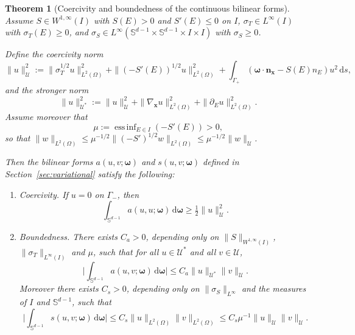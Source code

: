 \documentclass[10pt,a4paper]{amsart}
\newtheorem{theorem}{Theorem}
\renewcommand{\d}{\ensuremath{\,\mathrm{d}}}
\newcommand{\essinf}{\operatorname{ess\,inf}}         %
\newcommand{\qp}[1]{\ensuremath{\!\left({#1}\right)}}
\renewcommand{\vec}[1]{\ensuremath{\boldsymbol{#1}}}
\begin{document}
\begin{theorem}[Coercivity and boundedness of the continuous bilinear forms]
\label{the:coercivity}
Assume $S\in W^{1,\infty}(I)$ with $S(E)>0$ and $S'(E)\le 0$ on $I$,
$\sigma_T\in L^\infty(I)$ with $\sigma_T(E)\ge 0$, and $\sigma_S\in
L^\infty(\mathbb{S}^{d-1}\times\mathbb{S}^{d-1}\times I\times I)$ with
$\sigma_S\ge 0$.

Define the coercivity norm
\begin{equation*}
  \|u\|_{\mathcal{U}}^2
  :=
  \|\sigma_T^{1/2}u\|_{L^2(\Omega)}^2
  + \|(-S'(E))^{1/2}u\|_{L^2(\Omega)}^2
  + \int_{\Gamma_+} \qp{\vec{\omega}\cdot\vec{n}_{\vec x} - S(E) n_E} u^2 \d s,
\end{equation*}
and the stronger norm
\begin{equation*}
  \|u\|_{\mathcal{U}^*}^2
  :=
  \|u\|_{\mathcal{U}}^2
  + \|\nabla_{\vec x} u\|_{L^2(\Omega)}^2
  + \|\partial_E u\|_{L^2(\Omega)}^2.
\end{equation*}
Assume moreover that
\begin{equation*}
  \mu := \essinf_{E\in I}\qp{-S'(E)} > 0,
\end{equation*}
so that $\|w\|_{L^2(\Omega)} \le
\mu^{-1/2}\|(-S')^{1/2}w\|_{L^2(\Omega)} \le
\mu^{-1/2}\|w\|_{\mathcal{U}}$.

Then the bilinear forms $a(u,v;\vec{\omega})$ and $s(u,v;\vec{\omega})$
defined in Section~\ref{sec:variational} satisfy the following:

\begin{enumerate}
\item
  Coercivity. If $u=0$ on $\Gamma_-$, then
  \begin{equation*}
    \int_{\mathbb{S}^{d-1}} a(u,u;\vec{\omega}) \d\vec{\omega}
    \ge
    \tfrac{1}{2}\|u\|_{\mathcal{U}}^2.
  \end{equation*}
  
\item Boundedness. There exists $C_a>0$, depending only on
  $\|S\|_{W^{1,\infty}(I)}$, $\|\sigma_T\|_{L^\infty(I)}$ and $\mu$, such
  that for all $u\in\mathcal{U}^*$ and all $v\in\mathcal{U}$,
  \begin{equation*}
    \Big|\int_{\mathbb{S}^{d-1}} a(u,v;\vec{\omega}) \d\vec{\omega}\Big|
    \le
    C_a \|u\|_{\mathcal{U}^*}\|v\|_{\mathcal{U}}.
  \end{equation*}
  Moreover there exists $C_s>0$, depending only on
  $\|\sigma_S\|_{L^\infty}$ and the measures of $I$ and $\mathbb{S}^{d-1}$,
  such that
  \begin{equation*}
    \Big|\int_{\mathbb{S}^{d-1}} s(u,v;\vec{\omega}) \d\vec{\omega}\Big|
    \le
    C_s \|u\|_{L^2(\Omega)}\|v\|_{L^2(\Omega)}
    \le
    C_s \mu^{-1}\|u\|_{\mathcal{U}}\|v\|_{\mathcal{U}}.
  \end{equation*}
\end{enumerate}

\end{theorem}
\end{document}
